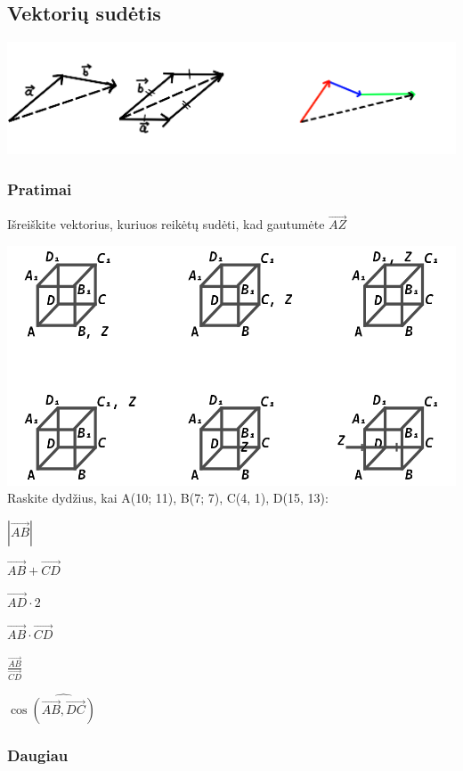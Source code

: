 \documentclass[fleqn]{article} %
\newenvironment{exercises}{\begin{enumerate*}[label=\alph*), itemjoin=\qquad]}{\end{enumerate*}}
\begin{document}
\clearpage

\subsection{Vektorių sudėtis}
\includegraphics{assets/vector_addition.png}

\subsubsection{Pratimai}

Išreiškite vektorius, kuriuos reikėtų sudėti, kad gautumėte $\vec{AZ}$

\includegraphics[max width=\textwidth]{assets/vector_exercise.png}
Raskite dydžius, kai A(10; 11), B(7; 7), C(4, 1), D(15, 13): \\
\begin{exercises}
    \item $|\vec{AB}|                           $
    \item $\vec{AB} + \vec{CD}                  $
    \item $\vec{AD} \cdot 2                     $
    \item $\vec{AB} \cdot \vec{CD}              $
    \item $\frac{\vec{AB}}{\vec{CD}}            $
    \item $\cos \widehat{(\vec{AB}, \vec{DC})}  $
\end{exercises}

\subsubsection{Daugiau}
\end{document}
